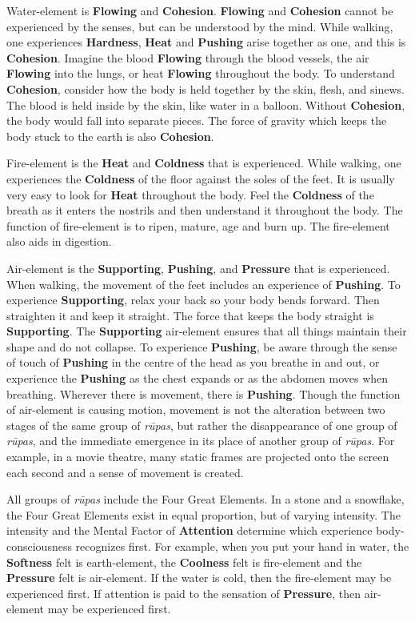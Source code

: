 Water-element is \textbf{Flowing} and \textbf{Cohesion}. \textbf{Flowing} and \textbf{Cohesion} cannot be experienced by the senses, but can be understood by the mind. While walking, one experiences \textbf{Hardness}, \textbf{Heat} and \textbf{Pushing} arise together as one, and this is \textbf{Cohesion}. Imagine the blood \textbf{Flowing} through the blood vessels, the air \textbf{Flowing} into the lungs, or heat \textbf{Flowing} throughout the body. To understand \textbf{Cohesion}, consider how the body is held together by the skin, flesh, and sinews. The blood is held inside by the skin, like water in a balloon. Without \textbf{Cohesion}, the body would fall into separate pieces. The force of gravity which keeps the body stuck to the earth is also \textbf{Cohesion}.

Fire-element is the \textbf{Heat} and \textbf{Coldness} that is experienced. While walking, one experiences the \textbf{Coldness} of the floor against the soles of the feet. It is usually very easy to look for \textbf{Heat} throughout the body. Feel the \textbf{Coldness} of the breath as it enters the nostrils and then understand it throughout the body. The function of fire-element is to ripen, mature, age and burn up. The fire-element also aids in digestion.

Air-element is the \textbf{Supporting}, \textbf{Pushing}, and \textbf{Pressure} that is experienced. When walking, the movement of the feet includes an experience of \textbf{Pushing}. To experience \textbf{Supporting}, relax your back so your body bends forward. Then straighten it and keep it straight. The force that keeps the body straight is \textbf{Supporting}. The \textbf{Supporting} air-element ensures that all things maintain their shape and do not collapse. To experience \textbf{Pushing}, be aware through the sense of touch of \textbf{Pushing} in the centre of the head as you breathe in and out, or experience the \textbf{Pushing} as the chest expands or as the abdomen moves when breathing. Wherever there is movement, there is \textbf{Pushing}. Though the function of air-element is causing motion, movement is not the alteration between two stages of the same group of \textit{rūpas}, but rather the disappearance of one group of \textit{rūpas}, and the immediate emergence in its place of another group of \textit{rūpas}. For example, in a movie theatre, many static frames are projected onto the screen each second and a sense of movement is created.

All groups of \textit{rūpas} include the Four Great Elements. In a stone and a snowflake, the Four Great Elements exist in equal proportion, but of varying intensity. The intensity and the Mental Factor of \textbf{Attention} determine which experience body-consciousness recognizes first. For example, when you put your hand in water, the \textbf{Softness} felt is earth-element, the \textbf{Coolness} felt is fire-element and the \textbf{Pressure} felt is air-element. If the water is cold, then the fire-element may be experienced first. If attention is paid to the sensation of \textbf{Pressure}, then air-element may be experienced first.

